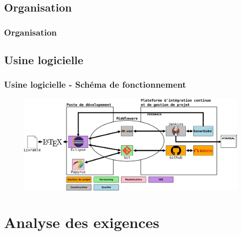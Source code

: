 \documentclass{beamer}
\begin{document}
\subsection{Organisation}
\begin{frame}[label=organisation]
\frametitle{Organisation}
%
\end{frame}

\subsection{Usine logicielle}
\begin{frame}[label=schemaFonctionnement]
  \frametitle{Usine logicielle - Schéma de fonctionnement}
\begin{figure}[H]
\label{schema}
  \centering
      \includegraphics[width=1.0\textwidth]{usine_vitameal.png} %
\end{figure}
\end{frame}

\section{Analyse des exigences}
\end{document}

